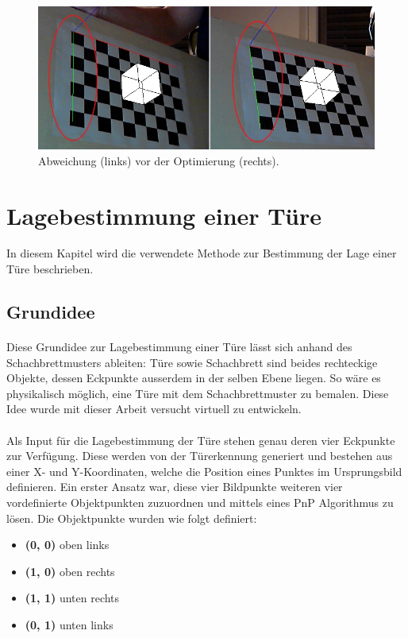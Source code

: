 \begin{figure}[!ht]
\centering
\includegraphics[scale=0.8]{images/floating-point-problem.jpg} 
\caption{Abweichung (links) vor der Optimierung (rechts).}
\label{fig:floating-point-problem}
\end{figure}


\section{Lagebestimmung einer Türe}

In diesem Kapitel wird die verwendete Methode zur Bestimmung der Lage einer Türe beschrieben.


\subsection{Grundidee}

\paragraph{}
Diese Grundidee zur Lagebestimmung einer Türe lässt sich anhand des Schachbrettmusters ableiten: Türe sowie Schachbrett sind beides rechteckige Objekte, dessen Eckpunkte ausserdem in der selben Ebene liegen. So wäre es physikalisch möglich, eine Türe mit dem Schachbrettmuster zu bemalen. 
Diese Idee wurde mit dieser Arbeit versucht virtuell zu entwickeln.
\\
\\
Als Input für die Lagebestimmung der Türe stehen genau deren vier Eckpunkte zur Verfügung. Diese werden von der Türerkennung generiert und bestehen aus einer X- und Y-Koordinaten, welche die Position eines Punktes im Ursprungsbild definieren. Ein erster Ansatz war, diese vier Bildpunkte weiteren vier vordefinierte Objektpunkten zuzuordnen und mittels eines PnP Algorithmus zu lösen. Die Objektpunkte wurden wie folgt definiert:

\begin{itemize}
\item \textbf{(0, 0)} oben links
\item \textbf{(1, 0)} oben rechts
\item \textbf{(1, 1)} unten rechts
\item \textbf{(0, 1)} unten links
\end{itemize}

